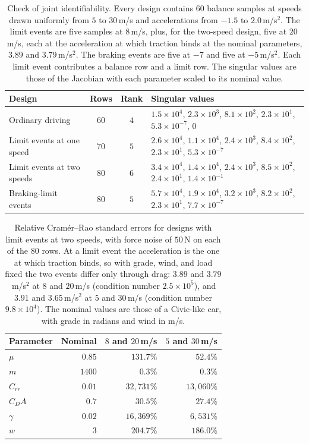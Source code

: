 \begin{table}[htbp]
\centering\small
\caption{Check of joint identifiability. Every design contains $60$ balance samples at speeds drawn uniformly from $5$ to $30$\,m/s and accelerations from $-1.5$ to $2.0$\,m/s$^2$. The limit events are five samples at $8$\,m/s, plus, for the two-speed design, five at $20$\,m/s, each at the acceleration at which traction binds at the nominal parameters, $3.89$ and $3.79$\,m/s$^2$. The braking events are five at $-7$ and five at $-5$\,m/s$^2$. Each limit event contributes a balance row and a limit row. The singular values are those of the Jacobian with each parameter scaled to its nominal value.}\label{tab:app-fisher}
\begin{tabular}{>{\raggedright\arraybackslash}p{3.6cm}cc>{\raggedright\arraybackslash}p{5.6cm}}
\toprule
Design & Rows & Rank & Singular values\\
\midrule
Ordinary driving & $60$ & $4$ & $1.5\times10^{4}$, $2.3\times10^{3}$, $8.1\times10^{2}$, $2.3\times10^{1}$, $5.3\times10^{-7}$, $0$\\
Limit events at one speed & $70$ & $5$ & $2.6\times10^{4}$, $1.1\times10^{4}$, $2.4\times10^{3}$, $8.4\times10^{2}$, $2.3\times10^{1}$, $5.3\times10^{-7}$\\
Limit events at two speeds & $80$ & $6$ & $3.4\times10^{4}$, $1.4\times10^{4}$, $2.4\times10^{3}$, $8.5\times10^{2}$, $2.4\times10^{1}$, $1.4\times10^{-1}$\\
Braking-limit events & $80$ & $5$ & $5.7\times10^{4}$, $1.9\times10^{4}$, $3.2\times10^{3}$, $8.2\times10^{2}$, $2.3\times10^{1}$, $7.7\times10^{-7}$\\
\bottomrule
\end{tabular}
\end{table}

\begin{table}[htbp]
\centering\small
\caption{Relative Cram\'er--Rao standard errors for designs with limit events at two speeds, with force noise of $50$\,N on each of the $80$ rows. At a limit event the acceleration is the one at which traction binds, so with grade, wind, and load fixed the two events differ only through drag: $3.89$ and $3.79$\,m/s$^2$ at $8$ and $20$\,m/s (condition number $2.5\times10^{5}$), and $3.91$ and $3.65$\,m/s$^2$ at $5$ and $30$\,m/s (condition number $9.8\times10^{4}$). The nominal values are those of a Civic-like car, with grade in radians and wind in m/s.}\label{tab:app-crb}
\begin{tabular}{lrrr}
\toprule
Parameter & Nominal & $8$ and $20$\,m/s & $5$ and $30$\,m/s\\
\midrule
$\mu$ & $0.85$ & $131.7\%$ & $52.4\%$\\
$m$ & $1400$ & $0.3\%$ & $0.3\%$\\
$C_{rr}$ & $0.01$ & $32{,}731\%$ & $13{,}060\%$\\
$C_DA$ & $0.7$ & $30.5\%$ & $27.4\%$\\
$\gamma$ & $0.02$ & $16{,}369\%$ & $6{,}531\%$\\
$w$ & $3$ & $204.7\%$ & $186.0\%$\\
\bottomrule
\end{tabular}
\end{table}
